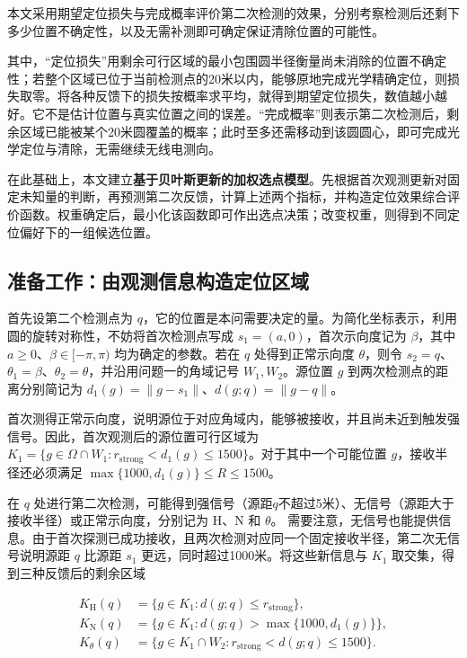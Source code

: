 \documentclass[UTF8,a4paper,zihao=-4,fontset=none]{ctexart}
\begin{document}
本文采用期望定位损失与完成概率评价第二次检测的效果，分别考察检测后还剩下多少位置不确定性，以及无需补测即可确定保证清除位置的可能性。

其中，“定位损失”用剩余可行区域的最小包围圆半径衡量尚未消除的位置不确定性；若整个区域已位于当前检测点的20米以内，能够原地完成光学精确定位，则损失取零。将各种反馈下的损失按概率求平均，就得到期望定位损失，数值越小越好。它不是估计位置与真实位置之间的误差。“完成概率”则表示第二次检测后，剩余区域已能被某个20米圆覆盖的概率；此时至多还需移动到该圆圆心，即可完成光学定位与清除，无需继续无线电测向。

在此基础上，本文建立\textbf{基于贝叶斯更新的加权选点模型}。先根据首次观测更新对固定未知量的判断，再预测第二次反馈，计算上述两个指标，并构造定位效果综合评价函数。权重确定后，最小化该函数即可作出选点决策；改变权重，则得到不同定位偏好下的一组候选位置。

\subsection{准备工作：由观测信息构造定位区域}

首先设第二个检测点为 \(q\)，它的位置是本问需要决定的量。为简化坐标表示，利用圆的旋转对称性，不妨将首次检测点写成 \(s_1=(a,0)\)，首次示向度记为 \(\beta\)，其中 \(a\ge0\)、\(\beta\in[-\pi,\pi)\) 均为确定的参数。若在 \(q\) 处得到正常示向度 \(\theta\)，则令 \(s_2=q\)、\(\theta_1=\beta\)、\(\theta_2=\theta\)，并沿用问题一的角域记号 \(W_1,W_2\)。源位置 \(g\) 到两次检测点的距离分别简记为 \(d_1(g)=\|g-s_1\|\)、\(d(g;q)=\|g-q\|\)。

首次测得正常示向度，说明源位于对应角域内，能够被接收，并且尚未近到触发强信号。因此，首次观测后的源位置可行区域为 \(K_1=\{g\in\Omega\cap W_1:r_{\mathrm{strong}}<d_1(g)\le1500\}\)。对于其中一个可能位置 \(g\)，接收半径还必须满足 \(\max\{1000,d_1(g)\}\le R\le1500\)。

在 \(q\) 处进行第二次检测，可能得到强信号（源距\(q\)不超过5米）、无信号（源距大于接收半径）或正常示向度，分别记为 \(\mathrm H\)、\(\mathrm N\) 和 \(\theta\)。
需要注意，无信号也能提供信息。由于首次探测已成功接收，且两次检测对应同一个固定接收半径，第二次无信号说明源距 \(q\) 比源距 \(s_1\) 更远，同时超过1000米。将这些新信息与 \(K_1\) 取交集，得到三种反馈后的剩余区域

\begin{equation}
\begin{aligned}
K_{\mathrm H}(q)&=\{g\in K_1:d(g;q)\le r_{\mathrm{strong}}\},\\
K_{\mathrm N}(q)&=\{g\in K_1:d(g;q)>\max\{1000,d_1(g)\}\},\\
K_\theta(q)&=\{g\in K_1\cap W_2:r_{\mathrm{strong}}<d(g;q)\le1500\}.
\end{aligned}
\label{eq:q2-pair-regions}
\end{equation}
\end{document}
